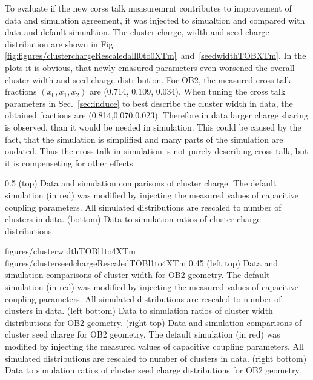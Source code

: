 To evaluate if the new corss talk measuremrnt contributes to improvement of data and simulation agreement, it was injected to simualtion and compared with data and default simualtion. The cluster charge, width and seed charge distribution are shown in Fig.\ref{fig:figures/clusterchargeRescaledalll0to0XTm}~and~\ref{seedwidthTOBXTm}. In the plots it is obvious, that newly emasured parameters even worsened the overall cluster width and seed charge distribution. For OB2, the measured cross talk fractions $(x_{0}, x_{1}, x_{2})$ are (0.714, 0.109, 0.034). When tuning the cross talk parameters in Sec.~\ref{sec:induce} to best describe the cluster width in data, the obtained fractions are (0.814,0.070,0.023). Therefore in data larger charge sharing is observed, than it would be needed in simulation. This could be caused by the fact, that the simulation is simplified and many parts of the simulation are oudated. Thus the cross talk in simulation is not purely describing cross talk, but it is compenseting for other effects. 


                 {0.5}       %
                 { (top) Data and simulation comparisons of cluster charge. The default simulation (in red) was modified by injecting the measured values of capacitive coupling parameters. All simulated distributions are rescaled to number of clusters in data. (bottom) Data to simulation ratios of cluster charge distributions. }

                 {figures/clusterwidthTOBl1to4XTm}
                 {figures/clusterseedchargeRescaledTOBl1to4XTm} %
                 {0.45}       %
                 {(left top) Data and simulation comparisons of cluster width for OB2 geometry. The default simulation (in red) was modified by injecting the measured values of capacitive coupling parameters. All simulated distributions are rescaled to number of clusters in data. (left bottom) Data to simulation ratios of cluster width distributions for OB2 geometry. (right top) Data and simulation  comparisons of cluster seed charge for OB2 geometry. The default simulation (in red) was modified by  injecting the measured values of capacitive coupling parameters. All simulated distributions are rescaled to number of clusters in data. (right bottom) Data to simulation ratios of cluster seed charge distributions for OB2 geometry. }

